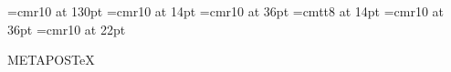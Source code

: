 \documentclass[danish,a2paper,22pt]{scrartcl}
\begin{document}
\pagecolor{Blue}


\font\romanxxl=cmr10 at 130pt
\font\romansmall=cmr10 at 14pt
\font\romanbig=cmr10 at 36pt
\font\typewritersmall=cmtt8 at 14pt
\font\metaessay=cmr10 at 36pt
\font\metatext=cmr10 at 22pt




\begin{center}
\color{White}
{\normalfont\logofamily \Huge METAPOS}\Huge {\TeX}
\vspace{2cm}
\end{center}
\end{document}
